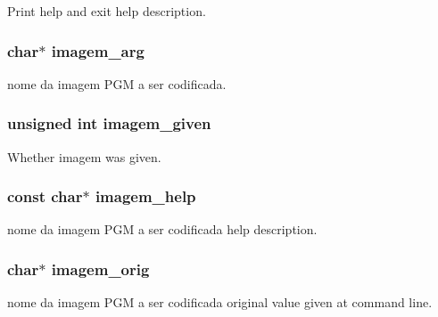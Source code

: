 Print help and exit help description. 

\subsubsection[{imagem\_\-arg}]{\setlength{\rightskip}{0pt plus 5cm}char$\ast$ {\bf imagem\_\-arg}}\label{da/dad/structgengetopt__args__info_a37c2bf095422011622ff31cd8b4eb0ad}


nome da imagem PGM a ser codificada. 

\subsubsection[{imagem\_\-given}]{\setlength{\rightskip}{0pt plus 5cm}unsigned int {\bf imagem\_\-given}}\label{da/dad/structgengetopt__args__info_aad9ba80412bb94d014dfa6f909afea35}


Whether imagem was given. 

\subsubsection[{imagem\_\-help}]{\setlength{\rightskip}{0pt plus 5cm}const char$\ast$ {\bf imagem\_\-help}}\label{da/dad/structgengetopt__args__info_aa6bca1d1fd4cdef5f7b12d0693f0ce88}


nome da imagem PGM a ser codificada help description. 

\subsubsection[{imagem\_\-orig}]{\setlength{\rightskip}{0pt plus 5cm}char$\ast$ {\bf imagem\_\-orig}}\label{da/dad/structgengetopt__args__info_aa503b6714a5634fc858ea135f6f13ca0}


nome da imagem PGM a ser codificada original value given at command line. 

